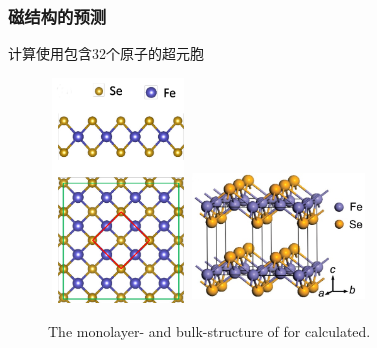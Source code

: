 \documentclass[cjk,slidestop,compress,mathserif,blue]{beamer}
\begin{document}
\frame
{
	\frametitle{\textrm{}磁结构的预测}
	计算使用包含32个原子的超元胞\\
\begin{figure}[h!]
\vspace*{-0.08in}
\centering
\includegraphics[height=2.35in,width=1.45in]{Figures/FeSe-struct-1.png}
\hskip 0.2in
\includegraphics[height=1.40in,width=1.80in]{Figures/FeSe-struct-2.png}
\caption{\tiny \textrm{The monolayer- and bulk-structure of  for calculated. }}%
\label{Fig:FeSe-Structure}
\end{figure}
}
\end{document}
